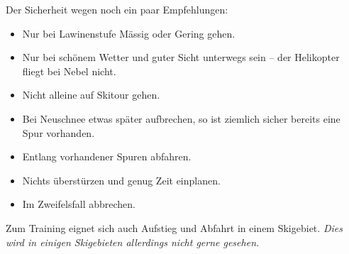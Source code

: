 Der Sicherheit wegen noch ein paar Empfehlungen:

\begin{itemize}
  \item{Nur bei Lawinenstufe Mässig oder Gering gehen.}
  \item{Nur bei schönem Wetter und guter Sicht unterwegs sein -- der Helikopter fliegt bei Nebel nicht.}
  \item{Nicht alleine auf Skitour gehen.}
  \item{Bei Neuschnee etwas später aufbrechen, so ist ziemlich sicher bereits eine Spur vorhanden.}
  \item{Entlang vorhandener Spuren abfahren.}
  \item{Nichts überstürzen und genug Zeit einplanen.}
  \item{Im Zweifelsfall abbrechen.}
\end{itemize}

Zum Training eignet sich auch Aufstieg und Abfahrt in einem Skigebiet.
\textit{Dies wird in einigen Skigebieten allerdings nicht gerne gesehen.}
